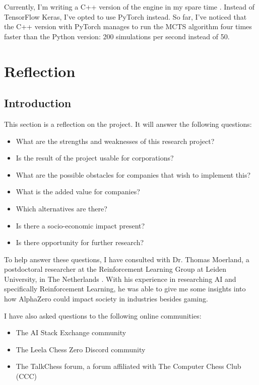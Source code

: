\documentclass{article}
\begin{document}
Currently, I'm writing a C++ version of the engine in my spare time \cite{zjefferChessdeeprlcpp2022}. 
Instead of TensorFlow Keras, I've opted to use PyTorch instead. 
So far, I've noticed that the C++ version with PyTorch manages to run the MCTS algorithm 
four times faster than the Python version: 200 simulations per second instead of 50.




\newpage
\section{Reflection}

\subsection{Introduction}

This section is a reflection on the project. It will answer the following questions:

\begin{itemize}
    \item What are the strengths and weaknesses of this research project?
    \item Is the result of the project usable for corporations?
    \item What are the possible obstacles for companies that wish to implement this?
    \item What is the added value for companies?
    \item Which alternatives are there?
    \item Is there a socio-economic impact present?
    \item Is there opportunity for further research?
\end{itemize}

To help answer these questions, I have consulted with Dr. Thomas Moerland, a postdoctoral 
researcher at the Reinforcement Learning Group at Leiden University, in The Netherlands \cite{ThomasMoerlandPostdoc}. 
With his experience in researching AI and specifically Reinforcement Learning, he was able 
to give me some insights into how AlphaZero could impact society in industries besides gaming.

I have also asked questions to the following online communities:

\begin{itemize}
    \item The AI Stack Exchange community %
    \item The Leela Chess Zero Discord community 
    \item The TalkChess forum, a forum affiliated with The Computer Chess Club (CCC)
\end{itemize}
\end{document}
